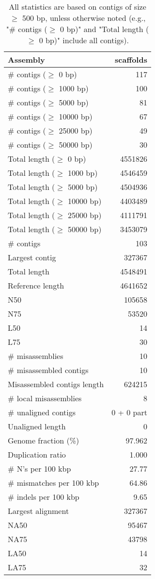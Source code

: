 \documentclass[12pt,a4paper]{article}
\begin{document}
\begin{table}[ht]
\begin{center}
\caption{All statistics are based on contigs of size $\geq$ 500 bp, unless otherwise noted (e.g., "\# contigs ($\geq$ 0 bp)" and "Total length ($\geq$ 0 bp)" include all contigs).}
\begin{tabular}{|l*{1}{|r}|}
\hline
Assembly & scaffolds \\ \hline
\# contigs ($\geq$ 0 bp) & 117 \\ \hline
\# contigs ($\geq$ 1000 bp) & 100 \\ \hline
\# contigs ($\geq$ 5000 bp) & 81 \\ \hline
\# contigs ($\geq$ 10000 bp) & 67 \\ \hline
\# contigs ($\geq$ 25000 bp) & 49 \\ \hline
\# contigs ($\geq$ 50000 bp) & 30 \\ \hline
Total length ($\geq$ 0 bp) & 4551826 \\ \hline
Total length ($\geq$ 1000 bp) & 4546459 \\ \hline
Total length ($\geq$ 5000 bp) & 4504936 \\ \hline
Total length ($\geq$ 10000 bp) & 4403489 \\ \hline
Total length ($\geq$ 25000 bp) & 4111791 \\ \hline
Total length ($\geq$ 50000 bp) & 3453079 \\ \hline
\# contigs & 103 \\ \hline
Largest contig & 327367 \\ \hline
Total length & 4548491 \\ \hline
Reference length & 4641652 \\ \hline
N50 & 105658 \\ \hline
N75 & 53520 \\ \hline
L50 & 14 \\ \hline
L75 & 30 \\ \hline
\# misassemblies & 10 \\ \hline
\# misassembled contigs & 10 \\ \hline
Misassembled contigs length & 624215 \\ \hline
\# local misassemblies & 8 \\ \hline
\# unaligned contigs & 0 + 0 part \\ \hline
Unaligned length & 0 \\ \hline
Genome fraction (\%) & 97.962 \\ \hline
Duplication ratio & 1.000 \\ \hline
\# N's per 100 kbp & 27.77 \\ \hline
\# mismatches per 100 kbp & 64.86 \\ \hline
\# indels per 100 kbp & 9.65 \\ \hline
Largest alignment & 327367 \\ \hline
NA50 & 95467 \\ \hline
NA75 & 43798 \\ \hline
LA50 & 14 \\ \hline
LA75 & 32 \\ \hline
\end{tabular}
\end{center}
\end{table}
\end{document}
